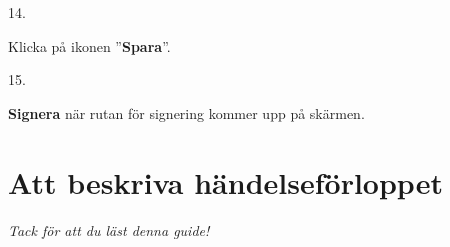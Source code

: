 \documentclass[paper=a5,DIV=15,headinclude,twoside=semi,openany,titlepage=firstiscover]{scrbook}
\begin{document}
\noindent\hrulefill

\vfill
\noindent
\begin{minipage}[t]{0.06\textwidth}
	14.
\end{minipage}%
\begin{minipage}[t]{.44\textwidth}\raggedright
	Klicka på ikonen ”\textbf{Spara}”.
\end{minipage}%
\begin{minipage}[t]{.5\textwidth}
	\hfill{}
\end{minipage}
\vfill

\noindent\hrulefill

\vfill
\noindent
\begin{minipage}[t]{0.06\textwidth}
	15.
\end{minipage}%
\begin{minipage}[t]{.44\textwidth}\raggedright
	\textbf{Signera} när rutan för signering kommer upp på skärmen.
\end{minipage}%
\begin{minipage}[t]{.5\textwidth}
	\hfill{}
\end{minipage}
\vfill

\noindent\hrulefill

\clearpage
\justify
\section*{Att beskriva händelseförloppet}

\clearpage

\begin{center}
\textit{Tack för att du läst denna guide!}
\end{center}
\end{document}
